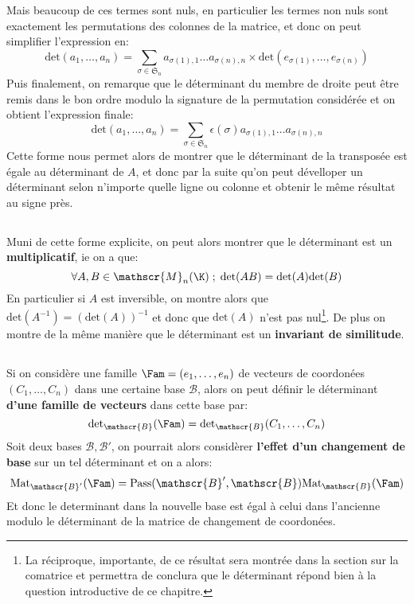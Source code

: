 Mais beaucoup de ces termes sont nuls, en particulier les termes non nuls sont exactement les permutations des colonnes de la matrice, et donc on peut simplifier l'expression en:
\[ 
   \text{det}(a_1, \ldots, a_n) = \sum_{\sigma \in \mathfrak{S}_n} a_{ \sigma(1), 1} \ldots a_{\sigma(n) , n}\times \text{det}(e_{\sigma(1)}, \ldots, e_{\sigma(n)})
\]
Puis finalement, on remarque que le déterminant du membre de droite peut être remis dans le bon ordre modulo la signature de la permutation considérée et on obtient l'expression finale:
\[ 
   \text{det}(a_1, \ldots, a_n) = \sum_{\sigma \in \mathfrak{S}_n} \epsilon(\sigma) a_{ \sigma(1), 1} \ldots a_{\sigma(n) , n}
\]
Cette forme nous permet alors de montrer que le déterminant de la transposée est égale au déterminant de \( A \), et donc par la suite qu'on peut dévelloper un déterminant selon n'importe quelle ligne ou colonne et obtenir le même résultat au signe près.
\subsection*{}
Muni de cette forme explicite, on peut alors montrer que le déterminant est un \textbf{multiplicatif}, ie on a que:
\[ 
   \forall A, B \in \mathscr{M}_n(\K) \; ; \; \text{det}(AB) = \text{det}(A)\text{det}(B) 
\]
En particulier si \( A \) est inversible, on montre alors que \( \text{det}(A^{-1}) = (\text{det}(A))^{-1} \) et donc que \( \text{det}(A) \) n'est pas nul\footnote[1]{La réciproque, importante, de ce résultat sera montrée dans la section sur la comatrice et permettra de conclura que le déterminant répond bien à la question introductive de ce chapitre.}. De plus on montre de la même manière que le déterminant est un \textbf{invariant de similitude}.
\subsection*{}
Si on considère une famille \(\Fam = (e_1 , \ldots, e_n)\) de vecteurs de coordonées \((C_1, \ldots, C_n)\) dans une certaine base \(\mathscr{B}\), alors on peut définir le déterminant \textbf{d'une famille de vecteurs} dans cette base par:
\[
   \text{det}_{\mathscr{B}}(\Fam) = \text{det}_{\mathscr{B}}(C_1, \ldots, C_n)
\]
Soit deux bases \(\mathscr{B, B'}\), on pourrait alors considèrer \textbf{l'effet d'un changement de base} sur un tel déterminant et on a alors:
\[ 
   \text{Mat}_{\mathscr{B}'}(\Fam) = \text{Pass}(\mathscr{B}', \mathscr{B})\text{Mat}_{\mathscr{B}}(\Fam)
\]
Et donc le determinant dans la nouvelle base est égal à celui dans l'ancienne modulo le déterminant de la matrice de changement de coordonées.
